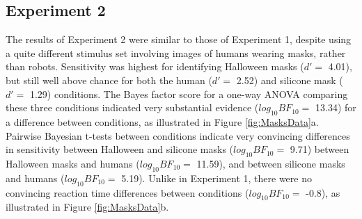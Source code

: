 \documentclass[
]{article}
\begin{document}
\hypertarget{experiment-2}{%
\subsection{Experiment 2}\label{experiment-2}}

The results of Experiment 2 were similar to those of Experiment 1, despite using a quite different stimulus set involving images of humans wearing masks, rather than robots. Sensitivity was highest for identifying Halloween masks (\(d' =\) 4.01), but still well above chance for both the human (\(d' =\) 2.52) and silicone mask (\(d' =\) 1.29) conditions. The Bayes factor score for a one-way ANOVA comparing these three conditions indicated very substantial evidence (\(log_{10}BF_{10} =\) 13.34) for a difference between conditions, as illustrated in Figure \ref{fig:MasksData}a. Pairwise Bayesian t-tests between conditions indicate very convincing differences in sensitivity between Halloween and silicone masks (\(log_{10}BF_{10} =\) 9.71) between Halloween masks and humans (\(log_{10}BF_{10} =\) 11.59), and between silicone masks and humans (\(log_{10}BF_{10} =\) 5.19). Unlike in Experiment 1, there were no convincing reaction time differences between conditions (\(log_{10}BF_{10} =\) -0.8), as illustrated in Figure \ref{fig:MasksData}b.
\end{document}
